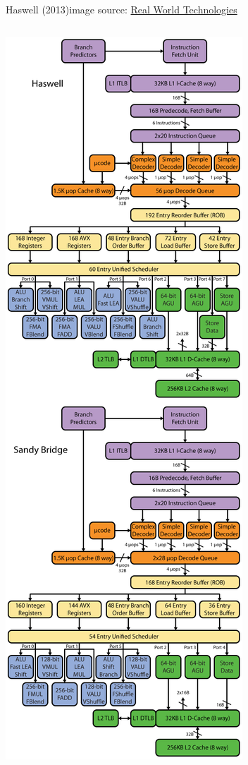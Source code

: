\documentclass[mathserif,xcolor={dvipsnames,table}]{beamer}
\begin{document}
\begin{frame}{Haswell (2013)\hfill\tiny{image source: \href{http://realworldtech.com}{Real World Technologies}}}
\begin{columns}
\begin{column}{.5\textwidth}
\includegraphics[scale=.225]{images/haswell-5.png}
\end{column}
\end{columns}
\end{frame}
\end{document}
